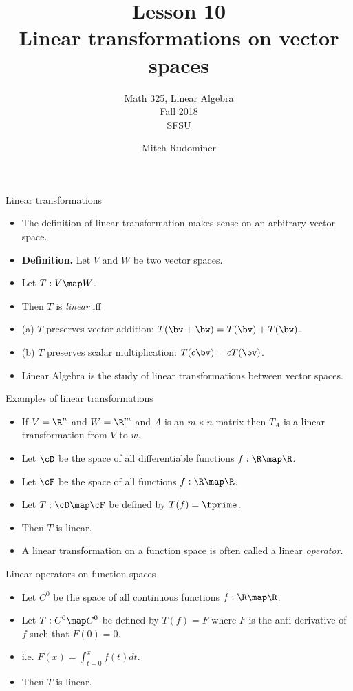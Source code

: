 \documentclass{beamer}
\title{Lesson 10 \\ Linear transformations on vector spaces}
\subtitle{Math 325, Linear Algebra \\ Fall 2018 \\ SFSU}
\author{Mitch Rudominer}
\date{}
\begin{document}
\begin{frame}
  \titlepage
\end{frame}

\begin{frame}{Linear transformations}

\begin{itemize}
\item The definition of linear transformation makes sense on an arbitrary vector space.
\item \textbf{Definition.} Let $V$ and $W$ be two vector spaces.
\item Let $T:V\map W$.
\item Then $T$ is \emph{linear} iff
\item (a) $T$ preserves vector addition: $T(\bv+\bw) = T(\bv) + T(\bw)$.
\item (b) $T$ preserves scalar multiplication: $T(c\bv) = c T(\bv)$.
\item Linear Algebra is the study of linear transformations between vector spaces.
\end{itemize}

\end{frame}


\begin{frame}{Examples of linear transformations}

\begin{itemize}
\item If $V=\R^n$ and $W=\R^m$ and $A$ is an $m\times n$ matrix then
$T_A$ is a linear transformation from $V$ to $w$.
\item Let $\cD$ be the space of all differentiable functions $f:\R\map\R$.
\item Let $\cF$ be the space of all functions $f:\R\map\R$.
\item Let $T:\cD\map\cF$ be defined by $T(f) = \fprime$.
\item Then $T$ is linear.
\item A linear transformation on a function space is often called a
linear \emph{operator}.
\end{itemize}

\end{frame}


\begin{frame}{Linear operators on function spaces}

\begin{itemize}
\item Let $C^0$ be the space of all continuous functions $f:\R\map\R$.
\item Let $T:C^0\map C^0$ be defined by $T(f) = F$ where $F$ is the
anti-derivative of $f$ such that $F(0) = 0$.
\item i.e. $F(x) = \int_{t=0}^x f(t) dt$.
\item Then $T$ is linear.
\end{itemize}

\end{frame}
\end{document}
